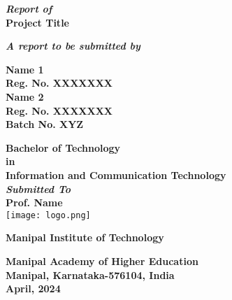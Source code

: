 \documentclass[12pt,a4paper,oneside]{report}
\begin{document}
\thispagestyle{empty}
\begin{center}
    {\textbf{\textit{Report of}\\}}
   {\Large\bf{Project Title} \\}

			    
			       \vspace{0.3in}
			     
			      
  {\textbf{\textit  {A report to be submitted by\\}}}
		       


			     \vspace{0.4in}
			    {\large \bf Name 1 \\
			    Reg. No. XXXXXXX\\
                Name 2 \\
			    Reg. No. XXXXXXX\\
                
                Batch No. XYZ\\
                }
			 
			  \vspace{0.3 in}

		       
		       \vspace{0.3 in}

		       
			    {\Large{\bf Bachelor of Technology \\ in \\Information and Communication Technology}\\}
                   \vspace{0.3in}
                {\bf\textit{Submitted To\\ }}
			{\Large{\bf Prof. Name}\\}		    
                \vspace{0.3in}
	      \texttt{[image: logo.png]}


		     {\large\bf Manipal Institute of Technology\\}
   
			 {\large\bf  Manipal Academy of Higher Education \\}
			     {\large\bf Manipal, Karnataka-576104, India \\}
			     {\large\bf  April, 2024 }
\end{center}
\date{02-04-2024}
\setcounter{page}{0}
\end{document}
